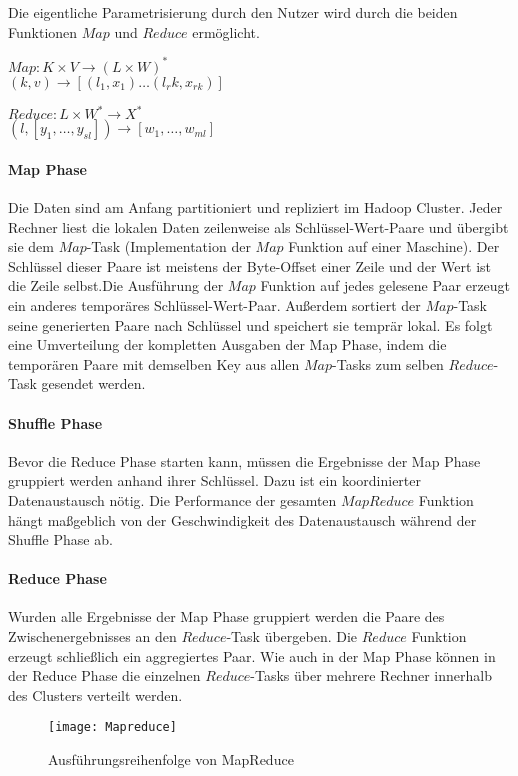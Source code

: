 Die eigentliche Parametrisierung durch den Nutzer wird durch die beiden Funktionen $Map$ und $Reduce$ ermöglicht.

\begin{center}
    $Map: K \times V \rightarrow (L \times W)^\ast$\\$(k, v) \rightarrow [(l_1, x_1) \dots (l_rk, x_{rk})]$
\end{center}
\begin{center}
    $Reduce: L \times W^\ast \rightarrow X^\ast$\\$(l, [y_1, \dots, y_{sl}]) \rightarrow [w_1, \dots, w_{ml}]$
\end{center}

\paragraph{Map Phase}$\;$ \\
Die Daten sind am Anfang partitioniert und repliziert im Hadoop Cluster. Jeder Rechner liest die lokalen Daten zeilenweise als Schlüssel-Wert-Paare und übergibt sie dem $Map$-Task (Implementation der $Map$ Funktion auf einer Maschine). Der Schlüssel dieser Paare ist meistens der Byte-Offset einer Zeile und der Wert ist die Zeile selbst.Die Ausführung der $Map$ Funktion auf jedes gelesene Paar erzeugt ein anderes temporäres Schlüssel-Wert-Paar. Außerdem sortiert der $Map$-Task seine generierten Paare nach Schlüssel und speichert sie temprär lokal. Es folgt eine Umverteilung der kompletten Ausgaben der Map Phase, indem die temporären Paare mit demselben Key aus allen $Map$-Tasks zum selben $Reduce$-Task gesendet werden.

\paragraph{Shuffle Phase}$\;$ \\
Bevor die Reduce Phase starten kann, müssen die Ergebnisse der Map Phase gruppiert werden anhand ihrer Schlüssel. Dazu ist ein koordinierter Datenaustausch nötig. Die Performance der gesamten $MapReduce$ Funktion hängt maßgeblich von der Geschwindigkeit des Datenaustausch während der Shuffle Phase ab.

\paragraph{Reduce Phase}$\;$ \\
Wurden alle Ergebnisse der Map Phase gruppiert werden die Paare des Zwischenergebnisses an den $Reduce$-Task übergeben. Die $Reduce$ Funktion erzeugt schließlich ein aggregiertes Paar. Wie auch in der Map Phase können in der Reduce Phase die einzelnen $Reduce$-Tasks über mehrere Rechner innerhalb des Clusters verteilt werden.

\begin{figure}
    \centering
    \texttt{[image: Mapreduce]}
    \caption{Ausführungsreihenfolge von MapReduce\cite{dg04}}
    \label{fig:mapreduce}
\end{figure}

